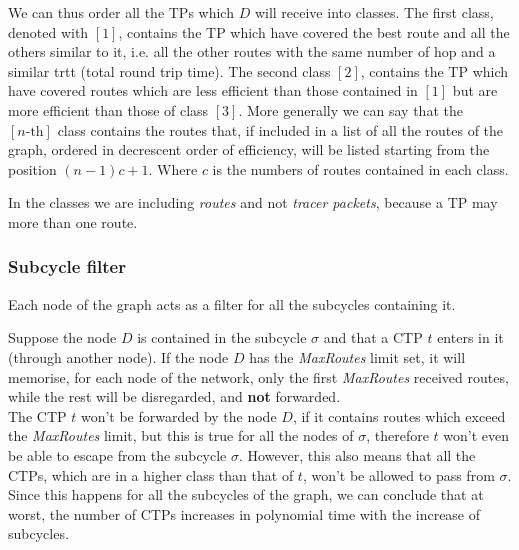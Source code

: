 \documentclass[a4paper]{article}
\begin{document}
We can thus order all the TPs which $D$ will receive into classes. The first
class, denoted with $[1]$, contains the TP which have covered the best
route and all the others similar to it, i.e. all the other routes with the same
number of hop and a similar trtt (total round trip time).
The second class $[2]$, contains the TP which have covered routes which are
less efficient than those contained in $[1]$ but are more efficient than those
of class $[3]$.
More generally we can say that the $[n\textrm{-th}]$ class contains the routes that,
if included in a list of all the routes of the graph, ordered in decrescent
order of efficiency, will be listed starting from the position $(n-1)c+1$. Where
$c$ is the numbers of routes contained in each class.

In the classes we are including \emph{routes} and not \emph{tracer packets},
because a TP may more than one route.

\subsubsection{Subcycle filter}
Each node of the graph acts as a filter for all the subcycles containing it.

Suppose the node $D$ is contained in the subcycle $\sigma$ and that a CTP $t$
enters in it (through another node).
If the node $D$ has the \emph{MaxRoutes} limit set, it will memorise, for each
node of the network, only the first \emph{MaxRoutes} received routes, while the
rest will be disregarded, and \textbf{not} forwarded. \\
The CTP $t$ won't be forwarded by the node $D$, if it contains routes which
exceed the \emph{MaxRoutes} limit, but this is true for all the nodes of
$\sigma$, therefore $t$ won't even be able to escape from the subcycle
$\sigma$. However, this also means that all the CTPs, which are in a higher
class than that of $t$, won't be allowed to pass from $\sigma$.\\

Since this happens for all the subcycles of the graph, we can conclude that at
worst, the number of CTPs increases in polynomial time with the increase of
subcycles.
\end{document}

